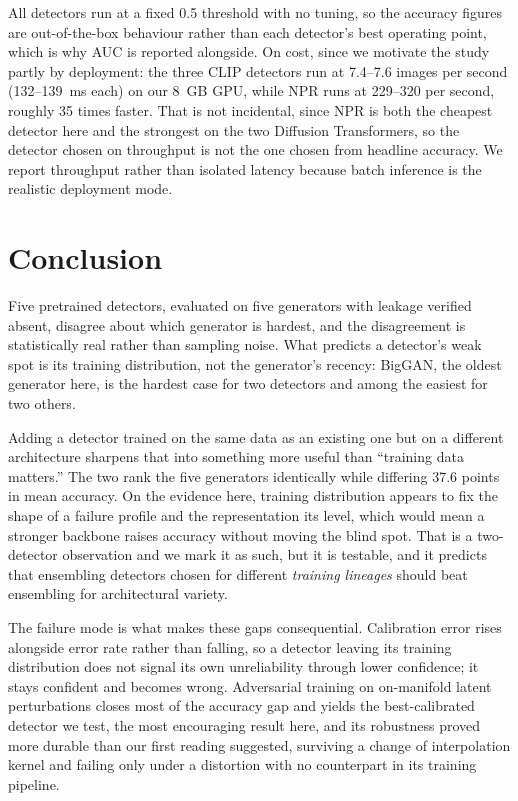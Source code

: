 \documentclass[3p,times,procedia]{elsarticle}
\begin{document}
All detectors run at a fixed 0.5 threshold with no tuning, so the accuracy
figures are out-of-the-box behaviour rather than each detector's best
operating point, which is why AUC is reported alongside. On cost, since we
motivate the study partly by deployment: the three CLIP detectors run at
7.4--7.6 images per second (132--139~ms each) on our 8~GB GPU, while NPR
runs at 229--320 per second, roughly 35 times faster. That is not
incidental, since NPR is both the cheapest detector here and the strongest
on the two Diffusion Transformers, so the detector chosen on throughput is
not the one chosen from headline accuracy. We report throughput rather than
isolated latency because batch inference is the realistic deployment mode.

\section{Conclusion}
\label{sec:conclusion}

Five pretrained detectors, evaluated on five generators with leakage
verified absent, disagree about which generator is hardest, and the
disagreement is statistically real rather than sampling noise. What
predicts a detector's weak spot is its training distribution, not the
generator's recency: BigGAN, the oldest generator here, is the hardest case
for two detectors and among the easiest for two others.

Adding a detector trained on the same data as an existing one but on a
different architecture sharpens that into something more useful than
``training data matters.'' The two rank the five generators identically
while differing 37.6 points in mean accuracy. On the evidence here,
training distribution appears to fix the shape of a failure profile and the
representation its level, which would mean a stronger backbone raises
accuracy without moving the blind spot. That is a two-detector observation
and we mark it as such, but it is testable, and it predicts that ensembling
detectors chosen for different \emph{training lineages} should beat
ensembling for architectural variety.

The failure mode is what makes these gaps consequential. Calibration error
rises alongside error rate rather than falling, so a detector leaving its
training distribution does not signal its own unreliability through lower
confidence; it stays confident and becomes wrong. Adversarial training on
on-manifold latent perturbations closes most of the accuracy gap and yields
the best-calibrated detector we test, the most encouraging result here, and
its robustness proved more durable than our first reading suggested,
surviving a change of interpolation kernel and failing only under a
distortion with no counterpart in its training pipeline.
\end{document}
